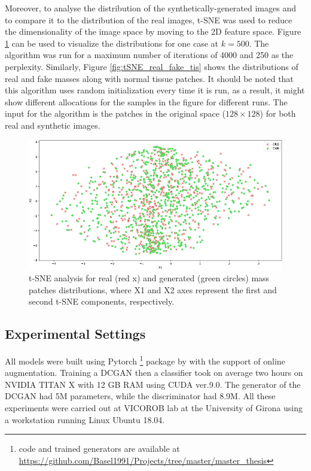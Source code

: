\documentclass[final,3p,twocolumn,authoryear,sort&compress,times]{maia}
\begin{document}
Moreover, to analyse the distribution of the synthetically-generated images and to compare it to the distribution of the real images, t-SNE was used to reduce the dimensionality of the image space by moving to the 2D feature space. Figure \ref{fig:tSNE_real_fake} can be used to visualize the distributions for one case at $k=500$. The algorithm was run for a maximum number of iterations of 4000 and 250 as the perplexity. Similarly, Figure \ref{fig:tSNE_real_fake_tis} shows the distributions of real and fake masses along with normal tissue patches. It should be noted that this algorithm uses random initialization every time it is run, as a result, it might show different allocations for the samples in the figure for different runs. The input for the algorithm is the patches in the original space ($128 \times 128$) for both real and synthetic images.

\begin{figure}[!htp]
\centering
\includegraphics[scale=1]{figures/tSNE_real_fake.pdf}
\caption{t-SNE analysis for real (red x) and generated (green circles) mass patches distributions, where X1 and X2 axes represent the first and second t-SNE components, respectively. }
\label{fig:tSNE_real_fake}
\end{figure}

\subsection{Experimental Settings}
All models were built using Pytorch \footnote{code and trained generators are available at \url{https://github.com/Basel1991/Projects/tree/master/master_thesis}} package by \citet{pytorch} with the support of online augmentation.
Training a DCGAN then a classifier took on average two hours on NVIDIA TITAN X with 12 GB RAM using CUDA ver.9.0. The generator of the DCGAN had 5M parameters, while the discriminator had 8.9M. All these experiments were carried out at VICOROB lab at the University of Girona using a workstation running Linux Ubuntu 18.04. 
\end{document}
